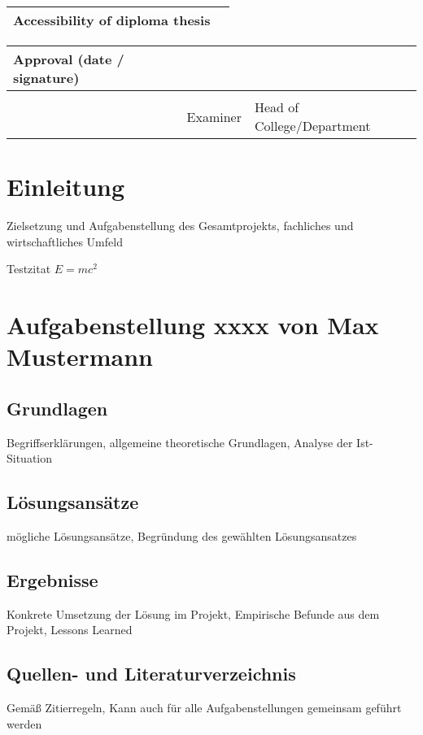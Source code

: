 \documentclass[letterpaper,10pt]{article}
\begin{document}
\begin{tabular*}{\textwidth}{|l | l|}
    \hline
    Accessibility of diploma thesis & \\

    \hline
\end{tabular*}


\begin{tabular*}{\textwidth}{|l | l| l |}
    \hline
    Approval (date / signature) & & \\
    \hline
     & & \\
    & Examiner & Head of College/Department \\
    \hline
\end{tabular*}

\pagebreak

\tableofcontents

\section{Einleitung}

Zielsetzung und Aufgabenstellung des Gesamtprojekts,
fachliches und wirtschaftliches Umfeld

Testzitat
 $E = mc^2$ \cite{einstein}

\section{Aufgabenstellung xxxx von Max Mustermann}
\subsection{Grundlagen}
Begriffserklärungen, allgemeine theoretische Grundlagen, Analyse der Ist-Situation
\subsection{Lösungsansätze}
mögliche Lösungsansätze, Begründung des gewählten Lösungsansatzes
\subsection{Ergebnisse}
Konkrete Umsetzung der Lösung im Projekt, Empirische Befunde aus dem Projekt, Lessons Learned
\subsection{Quellen- und Literaturverzeichnis}
Gemäß Zitierregeln, Kann auch für alle Aufgabenstellungen gemeinsam geführt werden
\end{document}
